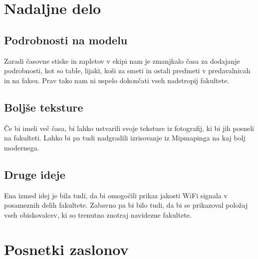 \documentclass[10pt,a4paper]{article}
\begin{document}
\section{Nadaljne delo}
\subsection{Podrobnosti na modelu}
Zaradi časovne stiske in zapletov v ekipi nam je zmanjkalo časa za dodajanje podrobnosti, kot so 
table, lijaki, koši za smeti in ostali predmeti v predavalnicah in na faksu. Prav
tako nam ni uspelo dokončati vseh nadstropij fakultete. 
\subsection{Boljše teksture}
Če bi imeli več časa, bi lahko ustvarili svoje teksture iz fotografij, ki bi 
jih posneli na fakulteti. Lahko bi pa tudi nadgradili izrisovanje iz Mipmapinga
na kaj bolj modernega. 
\subsection{Druge ideje}
Ena izmed idej je bila tudi, da bi omogočili prikaz jakosti WiFi signala v posameznih delih 
fakultete. Zabavno pa bi bilo tudi, da bi se prikazoval položaj vseh obiskovalcev, ki so trenutno
znotraj navidezne fakultete.
\pagebreak
\section{Posnetki zaslonov}
\end{document}
